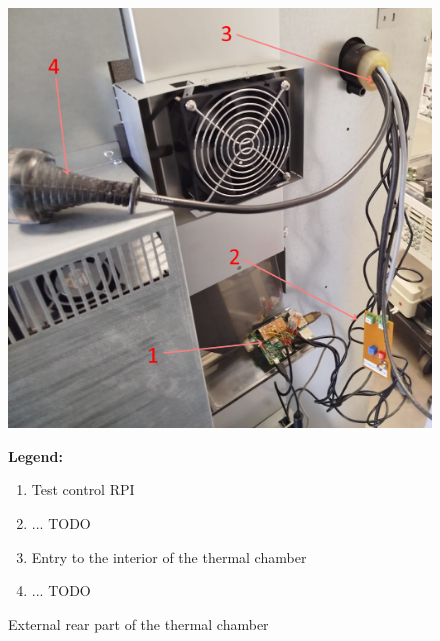 \begin{figure}[H]
    \centering
    \begin{minipage}{0.6\textwidth}
        \includegraphics[width=\linewidth]{figures/inst_inside_3.png}
    \end{minipage}%
    \hfill
    \begin{minipage}{0.35\textwidth}
        \small
        \textbf{Legend:}
        \begin{enumerate}
            \item Test control RPI
            \item ... TODO
            \item Entry to the interior of the thermal chamber
            \item ... TODO
        \end{enumerate}
    \end{minipage}
    \caption{External rear part of the thermal chamber}
    \label{fig:inst_inside_3}
\end{figure}

